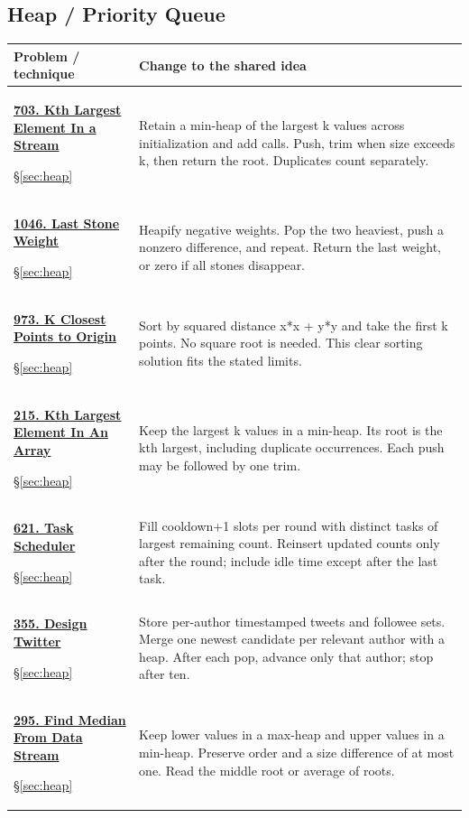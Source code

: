 \documentclass[11pt]{article}
\newcommand{\sect}[1]{\hyperref[sec:#1]{\S\ref*{sec:#1}}}
\begin{document}
\subsection{Heap / Priority Queue}
\begin{longtable}{@{}L{4.3cm}L{11.7cm}@{}}
\toprule Problem / technique & Change to the shared idea \\ \midrule\endhead
\hypertarget{lc703}{}\href{https://leetcode.com/problems/kth-largest-element-in-a-stream/}{\textbf{703. Kth Largest Element In a Stream}}\par\sect{heap} & Retain a min-heap of the largest k values across initialization and add calls. Push, trim when size exceeds k, then return the root. Duplicates count separately.\\[4pt]
\hypertarget{lc1046}{}\href{https://leetcode.com/problems/last-stone-weight/}{\textbf{1046. Last Stone Weight}}\par\sect{heap} & Heapify negative weights. Pop the two heaviest, push a nonzero difference, and repeat. Return the last weight, or zero if all stones disappear.\\[4pt]
\hypertarget{lc973}{}\href{https://leetcode.com/problems/k-closest-points-to-origin/}{\textbf{973. K Closest Points to Origin}}\par\sect{heap} & Sort by squared distance x*x + y*y and take the first k points. No square root is needed. This clear sorting solution fits the stated limits.\\[4pt]
\hypertarget{lc215}{}\href{https://leetcode.com/problems/kth-largest-element-in-an-array/}{\textbf{215. Kth Largest Element In An Array}}\par\sect{heap} & Keep the largest k values in a min-heap. Its root is the kth largest, including duplicate occurrences. Each push may be followed by one trim.\\[4pt]
\hypertarget{lc621}{}\href{https://leetcode.com/problems/task-scheduler/}{\textbf{621. Task Scheduler}}\par\sect{heap} & Fill cooldown+1 slots per round with distinct tasks of largest remaining count. Reinsert updated counts only after the round; include idle time except after the last task.\\[4pt]
\hypertarget{lc355}{}\href{https://leetcode.com/problems/design-twitter/}{\textbf{355. Design Twitter}}\par\sect{heap} & Store per-author timestamped tweets and followee sets. Merge one newest candidate per relevant author with a heap. After each pop, advance only that author; stop after ten.\\[4pt]
\hypertarget{lc295}{}\href{https://leetcode.com/problems/find-median-from-data-stream/}{\textbf{295. Find Median From Data Stream}}\par\sect{heap} & Keep lower values in a max-heap and upper values in a min-heap. Preserve order and a size difference of at most one. Read the middle root or average of roots.\\[4pt]
\bottomrule
\end{longtable}
\end{document}
